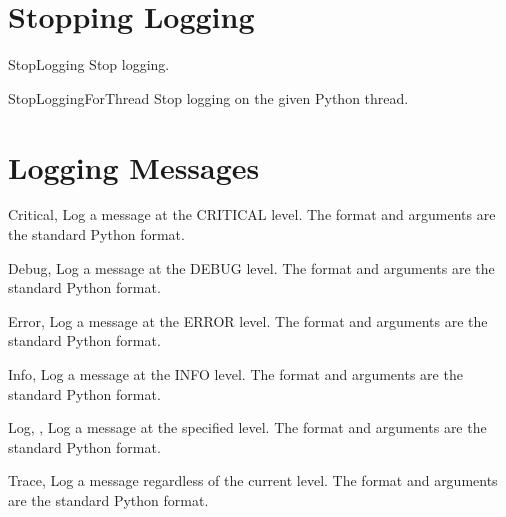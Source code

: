 \documentclass{manual}
\begin{document}
\section{Stopping Logging \label{pyStopLogging}}

\begin{funcdesc}{StopLogging}{}
  Stop logging.
\end{funcdesc}

\begin{funcdesc}{StopLoggingForThread}{}
  Stop logging on the given Python thread.
\end{funcdesc}


\section{Logging Messages \label{pyLogMessages}}

\begin{funcdesc}{Critical}{, }
  Log a message at the CRITICAL level. The format and arguments are the
  standard Python format.
\end{funcdesc}

\begin{funcdesc}{Debug}{, }
  Log a message at the DEBUG level. The format and arguments are the standard
  Python format.
\end{funcdesc}

\begin{funcdesc}{Error}{, }
  Log a message at the ERROR level. The format and arguments are the standard
  Python format.
\end{funcdesc}

\begin{funcdesc}{Info}{, }
  Log a message at the INFO level. The format and arguments are the standard
  Python format.
\end{funcdesc}

\begin{funcdesc}{Log}{, , }
  Log a message at the specified level. The format and arguments are the
  standard Python format.
\end{funcdesc}

\begin{funcdesc}{Trace}{, }
  Log a message regardless of the current level. The format and arguments are
  the standard Python format.
\end{funcdesc}
\end{document}

